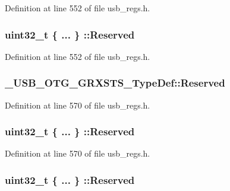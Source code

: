 Definition at line 552 of file usb\-\_\-regs.\-h.

\hypertarget{group___u_s_b___o_t_g___d_r_i_v_e_r_gab0f7f5e707683cfd4c2e5d8d1a14831d}{
\subsubsection[{Reserved}]{\setlength{\rightskip}{0pt plus 5cm}uint32\-\_\-t \{ ... \} \-::Reserved}}\label{group___u_s_b___o_t_g___d_r_i_v_e_r_gab0f7f5e707683cfd4c2e5d8d1a14831d}


Definition at line 552 of file usb\-\_\-regs.\-h.

\hypertarget{group___u_s_b___o_t_g___d_r_i_v_e_r_gac6ed8ae7244e39a9103516aaa72d4437}{
\subsubsection[{Reserved}]{ \-\_\-\-U\-S\-B\-\_\-\-O\-T\-G\-\_\-\-G\-R\-X\-S\-T\-S\-\_\-\-Type\-Def\-::\-Reserved}}\label{group___u_s_b___o_t_g___d_r_i_v_e_r_gac6ed8ae7244e39a9103516aaa72d4437}


Definition at line 570 of file usb\-\_\-regs.\-h.

\hypertarget{group___u_s_b___o_t_g___d_r_i_v_e_r_gac6bbc7bebe89786d02b620db3485059e}{
\subsubsection[{Reserved}]{\setlength{\rightskip}{0pt plus 5cm}uint32\-\_\-t \{ ... \} \-::Reserved}}\label{group___u_s_b___o_t_g___d_r_i_v_e_r_gac6bbc7bebe89786d02b620db3485059e}


Definition at line 570 of file usb\-\_\-regs.\-h.

\hypertarget{group___u_s_b___o_t_g___d_r_i_v_e_r_ga3b11ef601283e5664b924e20150dac3c}{
\subsubsection[{Reserved}]{\setlength{\rightskip}{0pt plus 5cm}uint32\-\_\-t \{ ... \} \-::Reserved}}\label{group___u_s_b___o_t_g___d_r_i_v_e_r_ga3b11ef601283e5664b924e20150dac3c}


